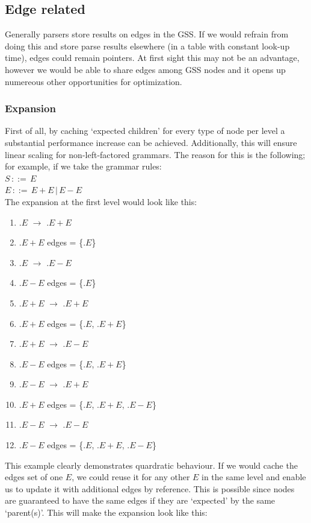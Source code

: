 \documentclass[a4paper,10pt]{article}
\begin{document}
\subsection{Edge related}
\label{sec:edgeOptimizations}

Generally parsers store results on edges in the GSS. If we would refrain from doing this and store parse results elsewhere (in a table with constant look-up time), edges could remain pointers. At first sight this may not be an advantage, however we would be able to share edges among GSS nodes and it opens up numereous other opportunities for optimization.

\subsubsection{Expansion}
\label{sec:nodeExpansionOptimization}
First of all, by caching `expected children' for every type of node per level a substantial performance increase can be achieved. Additionally, this will ensure linear scaling for non-left-factored grammars. The reason for this is the following; for example, if we take the grammar rules:\\
$S\,::=\,E$\\
$E\,::=\,E + E\,|\,E - E$\\
The expansion at the first level would look like this:
\begin{enumerate}
 \setlength{\itemsep}{0pt}
 \setlength{\parskip}{0pt}
 \setlength{\parsep}{0pt}
 
 \item $.E$ $\rightarrow$ $.E+E$
 \item $.E+E$ edges = \{$.E$\}
 \item $.E$ $\rightarrow$ $.E-E$
 \item $.E-E$ edges = \{$.E$\}
 \item $.E+E$ $\rightarrow$ $.E+E$
 \item $.E+E$ edges = \{$.E$, $.E+E$\}
 \item $.E+E$ $\rightarrow$ $.E-E$
 \item $.E-E$ edges = \{$.E$, $.E+E$\}
 \item $.E-E$ $\rightarrow$ $.E+E$
 \item $.E+E$ edges = \{$.E$, $.E+E$, $.E-E$\}
 \item $.E-E$ $\rightarrow$ $.E-E$
 \item $.E-E$ edges = \{$.E$, $.E+E$, $.E-E$\}
\end{enumerate}
This example clearly demonstrates quardratic behaviour. If we would cache the edges set of one $E$, we could reuse it for any other $E$ in the same level and enable us to update it with additional edges by reference. This is possible since nodes are guaranteed to have the same edges if they are `expected' by the same `parent(s)'. This will make the expansion look like this:
\end{document}
